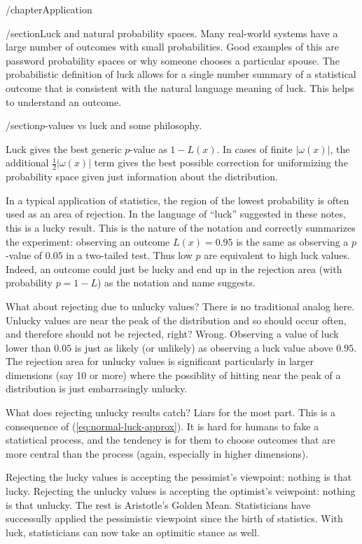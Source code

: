/chapter{Application}

/section{Luck and natural probability spaces.}
Many real-world systems have a large number of outcomes with small probabilities.  Good examples of this are password probability spaces or why someone chooses a particular spouse.  The probabilistic definition of luck allows for a single number summary of a statistical outcome that is consistent with the natural language meaning of luck.  This helps to understand an outcome.

/section{$p$-values vs luck and some philosophy.}

Luck gives the best generic $p$-value as $1-L(x)$.  In cases of finite $|\omega(x)|$, the additional $\frac{1}{2}|\omega(x)|$ term gives the best possible correction for uniformizing the probability space given just information about the distribution.

In a typical application of statistics, the region of the lowest probability is often used as an area of rejection.  In the language of ``luck'' suggested in these notes, this is a lucky result.  This is the nature of the notation and correctly summarizes the experiment: observing an outcome $L(x)=0.95$ is the same as observing a $p$-value of $0.05$ in a two-tailed test.  Thus low $p$ are equivalent to high luck values.  Indeed, an outcome could just be lucky and end up in the rejection area (with probability $p=1-L$) as the notation and name suggests.

What about rejecting due to unlucky values?  There is no traditional analog here.  Unlucky values are near the peak of the distribution and so should occur often, and therefore should not be rejected, right?  Wrong.  Observing a value of luck lower than $0.05$ is just as likely (or unlikely) as observing a luck value above $0.95$.  The rejection area for unlucky values is significant particularly in larger dimensions (say 10 or more) where the possiblity of hitting near the peak of a distribution is just embarrasingly unlucky.

What does rejecting unlucky results catch?  Liars for the most part.  This is a consequence of (\ref{eq:normal-luck-approx}).  It is hard for humans to fake a statistical process, and the tendency is for them to choose outcomes that are more central than the process (again, especially in higher dimensions).

Rejecting the lucky values is accepting the pessimist's viewpoint: nothing is that lucky.  Rejecting the unlucky values is accepting the optimist's veiwpoint: nothing is that unlucky.  The rest is Aristotle's Golden Mean.  Statisticians have successully applied the pessimistic viewpoint since the birth of statistics.  With luck, statisticians can now take an optimitic stance as well.

